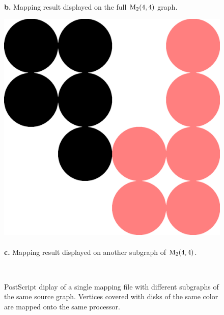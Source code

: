 \begin{itemize}
\begin{figure}[hbt]
{\hfill\ \\
{\bf b.} Mapping result displayed on the full ${\rm M}_{2}(4,4)$ graph.
}\ \hfill\
\parbox[t]{4.5cm}{
\hfill
\includegraphics[scale=0.25]{s_f_out3.ps}
\hfill\ \\
{\bf c.} Mapping result displayed on another subgraph of ${\rm M}_{2}(4,4)$.
}\hfill\
\caption{PostScript diplay of a single mapping file with different
         subgraphs of the same source graph. Vertices covered with disks
         of the same color are mapped onto the same processor.}
\label{fig-out-ps}
\end{figure}


\end{itemize}
